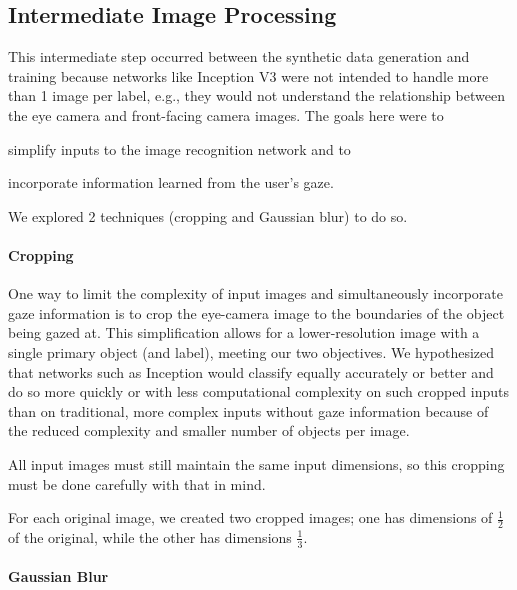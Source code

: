 \subsection{Intermediate Image Processing}

This intermediate step occurred between the synthetic data generation and training
because networks like Inception V3 were not intended to handle more than 1 image
per label, e.g., they would not understand the relationship between the eye
camera and front-facing camera images. The goals here were to
\begin{inlist}
\item simplify inputs to the image recognition network and to
\item incorporate information learned from the user's gaze.
\end{inlist}
We explored 2 techniques (cropping and Gaussian blur) to do so.

\paragraph{Cropping}

One way to limit the complexity of input images and simultaneously incorporate
gaze information is to crop the eye-camera image to the boundaries of the object
being gazed at. This simplification allows for a lower-resolution image with a
single primary object (and label), meeting our two objectives. We hypothesized
that networks such as Inception would classify equally accurately or better and
do so more quickly or with less computational complexity on such cropped inputs
than on traditional, more complex inputs without gaze information because of the
reduced complexity and smaller number of objects per image.

All input images must still maintain the same input dimensions, so this cropping
must be done carefully with that in mind.

For each original image, we created two cropped images; one has dimensions
of \(\frac{1}{2}\) of the original, while the other has dimensions
\(\frac{1}{3}\).

\paragraph{Gaussian Blur}

